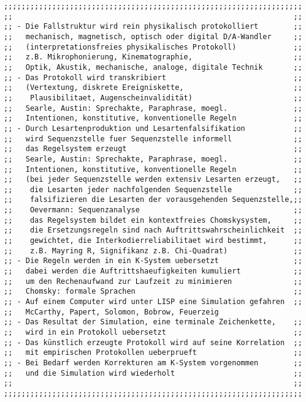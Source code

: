 \documentclass[12pt]{article}
\begin{document}
\begin{verbatim}
;;;;;;;;;;;;;;;;;;;;;;;;;;;;;;;;;;;;;;;;;;;;;;;;;;;;;;;;;;;;;;;;;;;;
;;                                                                ;;
;; - Die Fallstruktur wird rein physikalisch protokolliert        ;;
;;   mechanisch, magnetisch, optisch oder digital D/A-Wandler     ;;
;;   (interpretationsfreies physikalisches Protokoll)             ;;
;;   z.B. Mikrophonierung, Kinematographie,                       ;;
;;   Optik, Akustik, mechanische, analoge, digitale Technik       ;;
;; - Das Protokoll wird transkribiert                             ;;
;;   (Vertextung, diskrete Ereigniskette,                         ;;
;;    Plausibilitaet, Augenscheinvalidität)                       ;;
;;   Searle, Austin: Sprechakte, Paraphrase, moegl.               ;;
;;   Intentionen, konstitutive, konventionelle Regeln             ;;
;; - Durch Lesartenproduktion und Lesartenfalsifikation           ;;                      
;;   wird Sequenzstelle fuer Sequenzstelle informell              ;;
;;   das Regelsystem erzeugt                                      ;;
;;   Searle, Austin: Sprechakte, Paraphrase, moegl.               ;;
;;   Intentionen, konstitutive, konventionelle Regeln             ;;
;;   (bei jeder Sequenzstelle werden extensiv Lesarten erzeugt,   ;;
;;    die Lesarten jeder nachfolgenden Sequenzstelle              ;;
;;    falsifizieren die Lesarten der vorausgehenden Sequenzstelle,;;
;;    Oevermann: Sequenzanalyse                                   ;;
;;    das Regelsystem bildet ein kontextfreies Chomskysystem,     ;;
;;    die Ersetzungsregeln sind nach Auftrittswahrscheinlichkeit  ;;
;;    gewichtet, die Interkodierreliabilitaet wird bestimmt,      ;;
;;    z.B. Mayring R, Signifikanz z.B. Chi-Quadrat)               ;;
;; - Die Regeln werden in ein K-System uebersetzt                 ;;
;;   dabei werden die Auftrittshaeufigkeiten kumuliert            ;;
;;   um den Rechenaufwand zur Laufzeit zu minimieren              ;;
;;   Chomsky: formale Sprachen                                    ;;               
;; - Auf einem Computer wird unter LISP eine Simulation gefahren  ;;
;;   McCarthy, Papert, Solomon, Bobrow, Feuerzeig               
;; - Das Resultat der Simulation, eine terminale Zeichenkette,    ;;
;;   wird in ein Protokoll uebersetzt                             ;;
;; - Das künstlich erzeugte Protokoll wird auf seine Korrelation  ;;               
;;   mit empirischen Protokollen ueberprueft                      ;;                 
;; - Bei Bedarf werden Korrekturen am K-System vorgenommen        ;;
;;   und die Simulation wird wiederholt                           ;;
;;                                                                ;;
;;;;;;;;;;;;;;;;;;;;;;;;;;;;;;;;;;;;;;;;;;;;;;;;;;;;;;;;;;;;;;;;;;;;



\end{verbatim}
\end{document}
